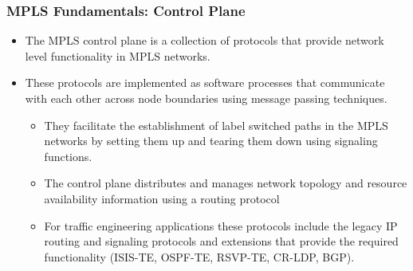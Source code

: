 \documentclass[12pt]{beamer}
\begin{document}
\begin{frame}
  \frametitle{MPLS Fundamentals: Control Plane}
  \begin{itemize}
    \item The MPLS control plane is a collection of protocols that provide network level functionality in MPLS networks.
    \item These protocols are implemented as software processes that communicate with each other across node boundaries using message passing techniques.
    \begin{itemize}
      \item They facilitate the establishment of label switched paths in the MPLS networks by setting them up and tearing them down using signaling functions.
      \item The control plane distributes and manages network topology and resource availability information using a routing protocol
      \item For traffic engineering applications these protocols include the legacy IP routing and signaling protocols and extensions that provide the required functionality (ISIS-TE, OSPF-TE, RSVP-TE, CR-LDP, BGP).
    \end{itemize}
  \end{itemize}
\end{frame}
\end{document}
